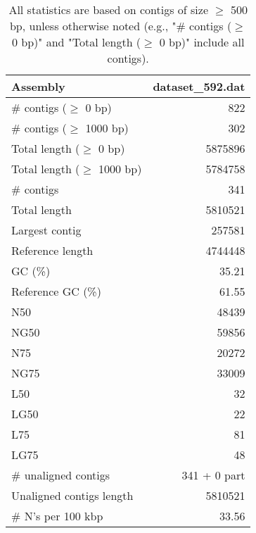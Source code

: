 \documentclass[12pt,a4paper]{article}
\begin{document}
\begin{table}[ht]
\begin{center}
\caption{All statistics are based on contigs of size $\geq$ 500 bp, unless otherwise noted (e.g., "\# contigs ($\geq$ 0 bp)" and "Total length ($\geq$ 0 bp)" include all contigs).}
\begin{tabular}{|l*{1}{|r}|}
\hline
Assembly & dataset\_592.dat \\ \hline
\# contigs ($\geq$ 0 bp) & 822 \\ \hline
\# contigs ($\geq$ 1000 bp) & 302 \\ \hline
Total length ($\geq$ 0 bp) & 5875896 \\ \hline
Total length ($\geq$ 1000 bp) & 5784758 \\ \hline
\# contigs & 341 \\ \hline
Total length & 5810521 \\ \hline
Largest contig & 257581 \\ \hline
Reference length & 4744448 \\ \hline
GC (\%) & 35.21 \\ \hline
Reference GC (\%) & 61.55 \\ \hline
N50 & 48439 \\ \hline
NG50 & 59856 \\ \hline
N75 & 20272 \\ \hline
NG75 & 33009 \\ \hline
L50 & 32 \\ \hline
LG50 & 22 \\ \hline
L75 & 81 \\ \hline
LG75 & 48 \\ \hline
\# unaligned contigs & 341 + 0 part \\ \hline
Unaligned contigs length & 5810521 \\ \hline
\# N's per 100 kbp & 33.56 \\ \hline
\end{tabular}
\end{center}
\end{table}
\end{document}
